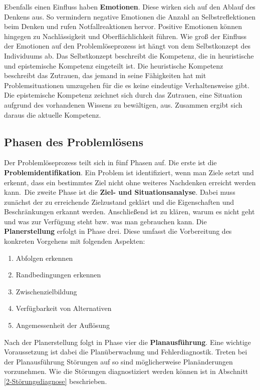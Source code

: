 Ebenfalls einen Einfluss haben \textbf{Emotionen}.
Diese wirken sich auf den Ablauf des Denkens aus. So vermindern negative Emotionen die Anzahl an Selbstreflektionen beim Denken und rufen Notfallreaktionen hervor. Positive Emotionen können hingegen zu Nachlässigkeit und Oberflächlichkeit führen. Wie groß der Einfluss der Emotionen auf den Problemlöseprozess ist hängt von dem Selbstkonzept des Individuums ab. Das Selbstkonzept beschreibt die Kompetenz, die in heuristische und epistemische Kompetenz eingeteilt ist. Die heuristische Kompetenz beschreibt das Zutrauen, das jemand in seine Fähigkeiten hat mit Problemsituationen umzugehen für die es keine eindeutige Verhaltensweise gibt. Die epistemische Kompetenz zeichnet sich durch das Zutrauen, eine Situation aufgrund des vorhandenen Wissens zu bewältigen, aus. Zusammen ergibt sich daraus die aktuelle Kompetenz. \cite{Dorner1984}

\subsection{Phasen des Problemlösens}
Der Problemlöseprozess teilt sich in fünf Phasen auf. Die erste ist die \textbf{Problemidentifikation}. \glqq Ein Problem ist identifiziert, wenn man Ziele setzt und erkennt, dass ein bestimmtes Ziel nicht ohne weiteres Nachdenken erreicht werden kann.\grqq \citep[146]{Betsch2011}\ Die zweite Phase ist die \textbf{Ziel- und Situationsanalyse}. Dabei muss zunächst der zu erreichende Zielzustand geklärt und die Eigenschaften und Beschränkungen erkannt werden. Anschließend ist zu klären, warum es nicht geht und was zur Verfügung steht bzw. was man gebrauchen kann. Die \textbf{Planerstellung} erfolgt in Phase drei. Diese umfasst die Vorbereitung des konkreten Vorgehens mit folgenden Aspekten:
\begin{enumerate}
\item Abfolgen erkennen
\item Randbedingungen erkennen
\item Zwischenzielbildung
\item Verfügbarkeit von Alternativen
\item Angemessenheit der Auflösung
\end{enumerate}
Nach der Planerstellung folgt in Phase vier die \textbf{Planausführung}. Eine wichtige Voraussetzung ist dabei die Planüberwachung und Fehlerdiagnostik. Treten bei der Planausführung Störungen auf so sind möglicherweise Planänderungen vorzunehmen. Wie die Störungen diagnostiziert werden können ist in Abschnitt \ref{2-Störungsdiagnose} beschrieben.

